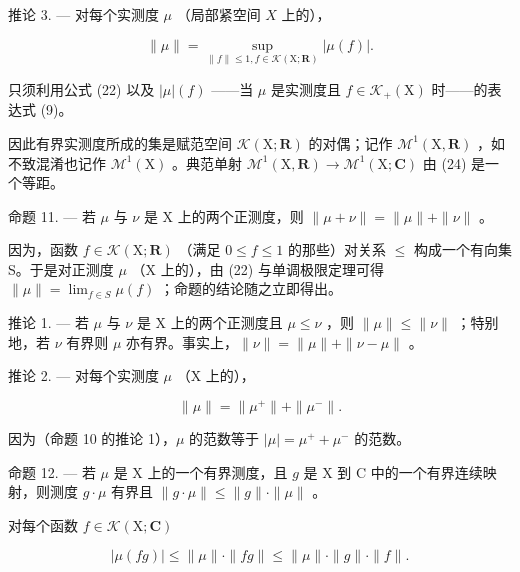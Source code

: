 推论 3. --- 对每个实测度 \(\mu\) （局部紧空间 \(X\) 上的），

\[
\| \mu \| = \sup _ {\| f \| \leqslant 1, f \in \mathcal{K} (\mathrm{X}; \mathbf {R})} | \mu (f) |.\tag{24}
\]

只须利用公式 (22) 以及 \(|\mu|(f)\) ——当 \(\mu\) 是实测度且 \(f \in \mathcal{K}_{+}(\mathrm{X})\) 时——的表达式 (9)。

因此有界实测度所成的集是赋范空间 \(\mathcal{K}(\mathrm{X};\mathbf{R})\) 的对偶；记作 \(\mathcal{M}^{1}(\mathrm{X},\mathbf{R})\) ，如不致混淆也记作 \(\mathcal{M}^{1}(\mathrm{X})\) 。典范单射 \(\mathcal{M}^{1}(\mathrm{X},\mathbf{R})\to\mathcal{M}^{1}(\mathrm{X};\mathbf{C})\) 由 (24) 是一个等距。

命题 11. --- 若 \(\mu\) 与 \(\nu\) 是 X 上的两个正测度，则 \(\| \mu + \nu \| = \| \mu \| + \| \nu \|\) 。

因为，函数 \(f \in \mathcal{K}(\mathrm{X}; \mathbf{R})\) （满足 \(0 \leqslant f \leqslant 1\) 的那些）对关系 \(\leqslant\) 构成一个有向集 S。于是对正测度 \(\mu\) （X 上的），由 (22) 与单调极限定理可得 \(\| \mu \| = \lim_{f \in S} \mu(f)\) ；命题的结论随之立即得出。

推论 1. --- 若 \(\mu\) 与 \(\nu\) 是 X 上的两个正测度且 \(\mu \leqslant \nu\) ，则 \(\| \mu \| \leqslant \| \nu \|\) ；特别地，若 \(\nu\) 有界则 \(\mu\) 亦有界。事实上，\(\| \nu \| = \| \mu \| + \| \nu - \mu \|\) 。

推论 2. --- 对每个实测度 \(\mu\) （X 上的），

\[
\| \mu \| = \| \mu^ {+} \| + \| \mu^ {-} \|.
\]

因为（命题 10 的推论 1），\(\mu\) 的范数等于 \(|\mu| = \mu^{+} + \mu^{-}\) 的范数。

命题 12. --- 若 \(\mu\) 是 X 上的一个有界测度，且 \(g\) 是 X 到 C 中的一个有界连续映射，则测度 \(g \cdot \mu\) 有界且 \(\| g \cdot \mu \| \leqslant \| g \| \cdot \| \mu \|\) 。

对每个函数 \(f\in \mathcal{K}(\mathrm{X};\mathbf{C})\)

\[
| \mu (f g) | \leqslant \| \mu \| \cdot \| f g \| \leqslant \| \mu \| \cdot \| g \| \cdot \| f \|.
\]

